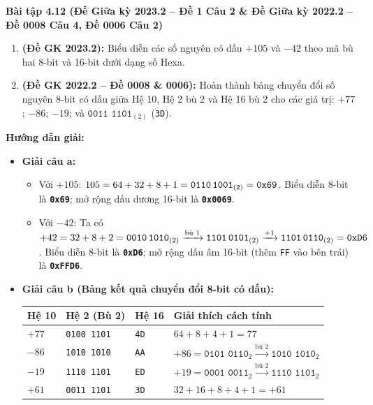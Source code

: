 \textbf{Bài tập 4.12 (Đề Giữa kỳ 2023.2 -- Đề 1 Câu 2 \& Đề Giữa kỳ 2022.2 -- Đề 0008 Câu 4, Đề 0006 Câu 2)}
\begin{enumerate}[label=\alph*)]
    \item \textbf{(Đề GK 2023.2):} Biểu diễn các số nguyên có dấu $+105$ và $-42$ theo mã bù hai 8-bit và 16-bit dưới dạng số Hexa.
    \item \textbf{(Đề GK 2022.2 -- Đề 0008 \& 0006):} Hoàn thành bảng chuyển đổi số nguyên 8-bit có dấu giữa Hệ 10, Hệ 2 bù 2 và Hệ 16 bù 2 cho các giá trị: $+77$; $-86$; $-19$; và $\texttt{0011 1101}_{(2)}$ (\texttt{3D}).
\end{enumerate}
\textbf{Hướng dẫn giải:}
\begin{itemize}
    \item \textbf{Giải câu a:}
    \begin{itemize}
        \item Với $+105$: $105 = 64 + 32 + 8 + 1 = \texttt{0110\,1001}_{(2)} = \texttt{0x69}$. Biểu diễn 8-bit là \textbf{\texttt{0x69}}; mở rộng dấu dương 16-bit là \textbf{\texttt{0x0069}}.
        \item Với $-42$: Ta có $+42 = 32 + 8 + 2 = \texttt{0010\,1010}_{(2)} \xrightarrow{\text{bù 1}} \texttt{1101\,0101}_{(2)} \xrightarrow{+1} \texttt{1101\,0110}_{(2)} = \texttt{0xD6}$. Biểu diễn 8-bit là \textbf{\texttt{0xD6}}; mở rộng dấu âm 16-bit (thêm \texttt{FF} vào bên trái) là \textbf{\texttt{0xFFD6}}.
    \end{itemize}
    \item \textbf{Giải câu b (Bảng kết quả chuyển đổi 8-bit có dấu):}
    \begin{center}
    \renewcommand{\arraystretch}{1.2}
    \small
    \begin{tabularx}{0.9\linewidth}{|C{2.2cm}|C{3.2cm}|C{2.2cm}|Y|}
    \hline
    \textbf{Hệ 10} & \textbf{Hệ 2 (Bù 2)} & \textbf{Hệ 16} & \textbf{Giải thích cách tính} \\ \hline
    $+77$ & \texttt{0100 1101} & \texttt{4D} & $64 + 8 + 4 + 1 = 77$ \\ \hline
    $-86$ & \texttt{1010 1010} & \texttt{AA} & $+86 = \texttt{0101 0110}_2 \xrightarrow{\text{bù 2}} \texttt{1010 1010}_2$ \\ \hline
    $-19$ & \texttt{1110 1101} & \texttt{ED} & $+19 = \texttt{0001 0011}_2 \xrightarrow{\text{bù 2}} \texttt{1110 1101}_2$ \\ \hline
    $+61$ & \texttt{0011 1101} & \texttt{3D} & $32 + 16 + 8 + 4 + 1 = +61$ \\ \hline
    \end{tabularx}
    \end{center}
\end{itemize}

